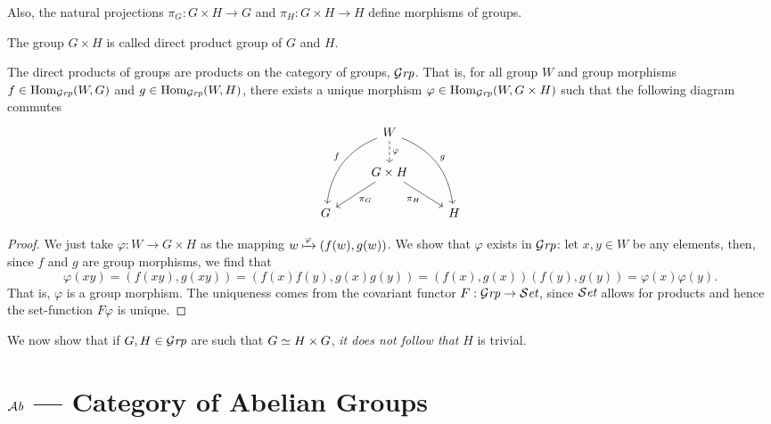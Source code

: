 Also, the natural projections \(\pi_G: G \times H \to G\) and \(\pi_H: G \times
H \to H\) define morphisms of groups.

\begin{definition}
  The group \(G \times H\) is called direct product group of \(G\) and \(H\).
\end{definition}

\begin{proposition}
  The direct products of groups are products on the category of groups,
  \({\mathcal{G}\textit{rp}}\). That is, for all group \(W\) and group morphisms \(f \in
  \operatorname{Hom}_{\mathcal{G}\textit{rp}}(W, G)\) and \(g \in \operatorname{Hom}_{\mathcal{G}\textit{rp}}(W, H)\), there exists a unique
  morphism \(\varphi \in \operatorname{Hom}_{\mathcal{G}\textit{rp}}(W, G \times H)\) such that the following
  diagram commutes
  \[
    \begin{tikzcd}
      &W
      \ar[d, dashed, "\varphi"]
      \ar[ddr, bend left, "g"]
      \ar[ddl, swap, bend right, "f"]
      & \\
      &G \times H \ar[dr, swap, "\pi_H"] \ar[dl, "\pi_G"] & \\
      G & &H
    \end{tikzcd}
  \]
\end{proposition}

\begin{proof}
  We just take \(\varphi: W \to G \times H\) as the mapping \(w \xmapsto \varphi
  (f(w), g(w))\). We show that \(\varphi\) exists in \({\mathcal{G}\textit{rp}}\): let \(x, y \in
  W\) be any elements, then, since \(f\) and \(g\) are group morphisms, we find
  that
  \[
    \varphi(xy) = (f(xy), g(xy)) = (f(x) f(y), g(x) g(y))
    = (f(x), g(x)) (f(y), g(y)) = \varphi(x) \varphi(y).
  \]
  That is, \(\varphi\) is a group morphism. The uniqueness comes from the
  covariant functor \(F: {\mathcal{G}\textit{rp}} \to {\mathcal{S}\textit{et}}\), since \({\mathcal{S}\textit{et}}\) allows for products and
  hence the set-function \(F \varphi\) is unique.
\end{proof}

\begin{remark}
  We now show that if \(G, H \in {\mathcal{G}\textit{rp}}\) are such that \(G \simeq H \times G\),
  \emph{it does not follow that} \(H\) is trivial.
\end{remark}

\section{\texorpdfstring{\({\mathcal{A}\textit{b}}\)}{Ab} --- Category of Abelian Groups}


